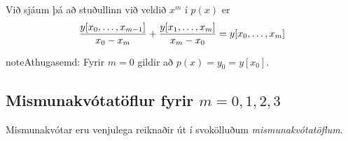 \documentclass[A4paper,10pt,icelandic]{sphinxmanual}
\begin{document}
Við sjáum þá að stuðullinn við veldið \(x^m\) í \(p(x)\) er
\begin{gather}
\begin{split}\frac{y[x_0, \ldots, x_{m-1}]}{x_0-x_m} +
  \frac{y[x_1, \ldots, x_m]}{x_m - x_0}
  = y[x_0, \ldots, x_m]\end{split}\notag
\end{gather}
\begin{notice}{note}{Athugasemd:}
Fyrir \(m=0\) gildir að \(p(x) = y_0 = y[x_0]\).
\end{notice}


\subsection{Mismunakvótatöflur fyrir \(m=0,1,2,3\)}
\label{kafli03:index-10}\label{kafli03:mismunakvotatoflur-fyrir}
Mismunakvótar eru venjulega reiknaðir út í svokölluðum
\emph{mismunakvótatöflum}.
\end{document}
